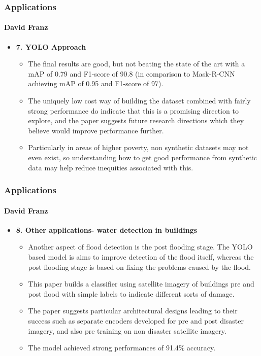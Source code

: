 \documentclass{beamer}
\newcommand{\namedframe}[3]{
  \begin{frame}
    \frametitle{#2}
    \framesubtitle{#1}
    #3
  \end{frame}
}
\begin{document}
\namedframe{David Franz}{Applications}{
\begin{itemize}
    \item \textbf{7. YOLO Approach}
    \begin{itemize}
        \item The final results are good, but not beating the state of the art with a mAP of 0.79 and F1-score of 90.8 (in comparison to Mask-R-CNN achieving mAP of 0.95 and F1-score of 97). 
        \item The uniquely low cost way of building the dataset combined with fairly strong performance do indicate that this is a promising direction to explore, and the paper suggests future research directions which they believe would improve performance further. 
        \item Particularly in areas of higher poverty, non synthetic datasets may not even exist, so understanding how to get good performance from synthetic data may help reduce inequities associated with this.
    \end{itemize}
\end{itemize}
}



\namedframe{David Franz}{Applications}{
\begin{itemize}
    \item \textbf{8. Other applications- water detection in buildings}
    \begin{itemize}
        \item Another aspect of flood detection is the post flooding stage. The YOLO based model is aims to improve detection of the flood itself, whereas the post flooding stage is based on fixing the problems caused by the flood.
        \item This paper builds a classifier using satellite imagery of buildings pre and post flood with simple labels to indicate different sorts of damage.  
        \item         The paper suggests particular architectural designs leading to their success such as separate encoders developed for pre and post disaster imagery, and also pre training on non disaster satellite imagery. 
        \item The model achieved strong performances of 91.4\% accuracy. 
    \end{itemize}
\end{itemize}
}
\end{document}

